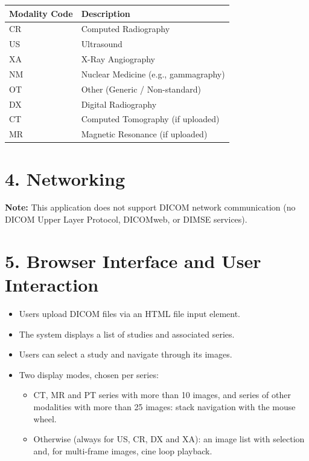 \documentclass[11pt]{article}
\begin{document}
\begin{center}
\begin{tabular}{ll}
\toprule
\textbf{Modality Code} & \textbf{Description} \\
\midrule
CR & Computed Radiography \\
US & Ultrasound \\
XA & X-Ray Angiography \\
NM & Nuclear Medicine (e.g., gammagraphy) \\
OT & Other (Generic / Non-standard) \\
DX & Digital Radiography \\
CT & Computed Tomography (if uploaded) \\
MR & Magnetic Resonance (if uploaded) \\
\bottomrule
\end{tabular}
\end{center}

\section*{4. Networking}

\textbf{Note:} This application does not support DICOM network communication (no DICOM Upper Layer Protocol, DICOMweb, or DIMSE services).

\section*{5. Browser Interface and User Interaction}

\begin{itemize}
  \item Users upload DICOM files via an HTML file input element.
  \item The system displays a list of studies and associated series.
  \item Users can select a study and navigate through its images.
  \item Two display modes, chosen per series:
    \begin{itemize}
      \item CT, MR and PT series with more than 10 images, and series of other modalities with more than 25 images: stack navigation with the mouse wheel.
      \item Otherwise (always for US, CR, DX and XA): an image list with selection and, for multi-frame images, cine loop playback.
    \end{itemize}
\end{itemize}
\end{document}
